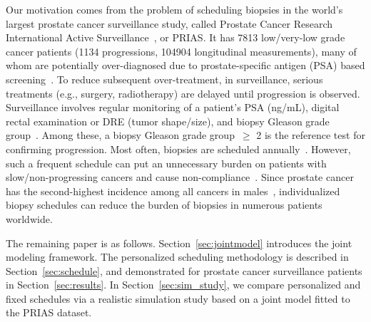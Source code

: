 Our motivation comes from the problem of scheduling biopsies in the world's largest prostate cancer surveillance study, called Prostate Cancer Research International Active Surveillance~\citep{bokhorst2015compliance}, or PRIAS. It has 7813 low/very-low grade cancer patients (1134 progressions, 104904 longitudinal measurements), many of whom are potentially over-diagnosed due to prostate-specific antigen (PSA) based screening~\citep{loeb2014overdiagnosis}. To reduce subsequent over-treatment, in surveillance, serious treatments (e.g., surgery, radiotherapy) are delayed until progression is observed. Surveillance involves regular monitoring of a patient's PSA (ng/mL), digital rectal examination or DRE (tumor shape/size), and biopsy Gleason grade group~\citep{epsteinGG2014}. Among these, a biopsy Gleason grade group~$\geq$ 2 is the reference test for confirming progression. Most often, biopsies are scheduled annually~\citep{loeb2014heterogeneity}. However, such a frequent schedule can put an unnecessary burden on patients with slow/non-progressing cancers and cause non-compliance~\citep{bokhorst2015compliance}. Since prostate cancer has the second-highest incidence among all cancers in males~\citep{GlobalCancerStats2012}, individualized biopsy schedules can reduce the burden of biopsies in numerous patients worldwide.

The remaining paper is as follows. Section~\ref{sec:jointmodel} introduces the joint modeling framework. The personalized scheduling methodology is described in Section~\ref{sec:schedule}, and demonstrated for prostate cancer surveillance patients in Section~\ref{sec:results}. In Section~\ref{sec:sim_study}, we compare personalized and fixed schedules via a realistic simulation study based on a joint model fitted to the PRIAS dataset.